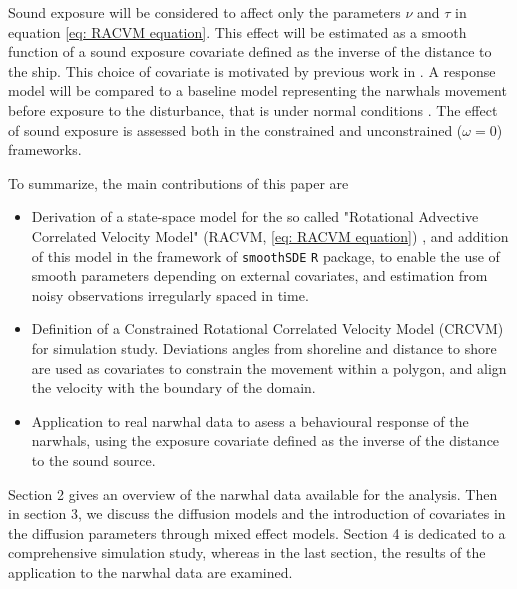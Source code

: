 \documentclass[11pt]{article}
\newcommand {\1}{\mathbb{1}}
\begin{document}
Sound exposure will be considered to affect only the parameters $\nu$ and $\tau$ in equation \ref{eq: RACVM equation}. This effect will be estimated as a smooth function of a sound exposure covariate defined as the inverse of the distance to the ship. This choice of covariate is motivated by previous work in \cite{heide-jorgensen_behavioral_2021}. A response model will be compared to a baseline model representing the narwhals movement before exposure to the disturbance, that is under normal conditions \cite{michelot_continuous-time_2022}.
The effect of sound exposure is assessed both in the constrained and unconstrained ($\omega=0$) frameworks.



To summarize, the main contributions of this paper are
\begin{itemize}
	\item Derivation of a state-space model for the so called "Rotational Advective Correlated Velocity Model" (RACVM, \ref{eq: RACVM equation}) \cite{gurarie_correlated_2017}, and addition of this model in the framework of \texttt{smoothSDE} \texttt{R} package, to enable the use of smooth parameters depending on external covariates, and estimation from noisy observations irregularly spaced in time.
	\item Definition of a Constrained Rotational Correlated Velocity Model (CRCVM) for simulation study. Deviations angles from shoreline and distance to shore are used as covariates to constrain the movement within a polygon, and align the velocity with the boundary of the domain.
	\item Application to real narwhal data to asess a behavioural response of the narwhals, using the exposure covariate defined as the inverse of the distance to the sound source.
\end{itemize}

Section 2 gives an overview of the narwhal data available for the analysis. Then in section 3, we discuss the diffusion models and the introduction of covariates in the diffusion parameters through mixed effect models. Section 4 is dedicated to a comprehensive simulation study, whereas in the last section, the results of the application to the narwhal data are examined.
\end{document}

